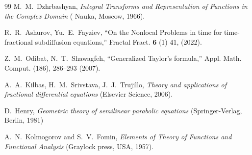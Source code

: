 \documentclass[reqno]{amsart}
\theoremstyle{definition}
\numberwithin{equation}{section}
\begin{document}
\begin{thebibliography}{99}
 M.~M.~Dzhrbashyan, \textit{Integral Transforms and Representation of Functions in the Complex Domain} ( Nauka, Moscow, 1966).

 R.~R.~Ashurov, Yu.~E.~Fayziev, ``On the Nonlocal Problems in time for time-fractional subdiffusion equations,'' Fractal Fract.  \textbf{6} (1) 41, (2022).

 Z.~M.~Odibat, N.~T.~Shawagfeh, ``Generalized Taylor’s formula,'' Appl. Math. Comput. (186), 286--293 (2007).

 A.~A.~Kilbas, H.~M.~Srivstava, J.~J.~Trujillo, \textit{Theory and applications of fractional differential equations}  (Elsevier Science, 2006).

 D.~Henry, \textit{Geometric theory of semilinear parabolic equations} (Springer-Verlag, Berlin, 1981)

 A.~N.~Kolmogorov and S.~V.~Fomin, \textit{Elements of Theory of Functions and Functional Analysis} (Graylock press, USA, 1957).

\end{thebibliography}
%
\end{document}
